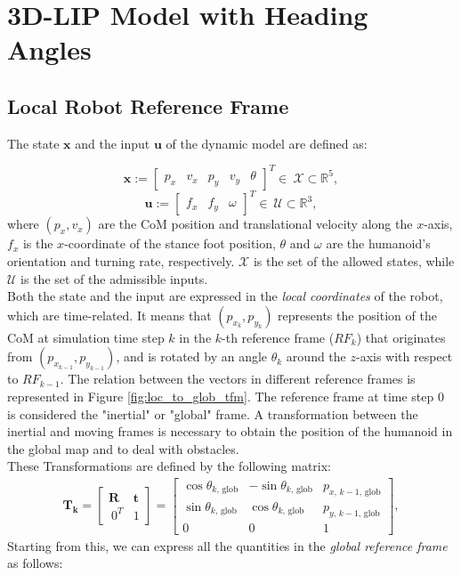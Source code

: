 \section{3D-LIP Model with Heading Angles}\label{sec:lip}

\subsection{Local Robot Reference Frame}
The state $\mathbf{x}$ and the input $\mathbf{u}$ of the dynamic model are defined as:

$$ \mathbf{x} := \begin{bmatrix} p_x & v_x & p_y & v_y & \theta \end{bmatrix}^T \in \ \mathcal{X} \subset \mathbb{R}^5 , $$
$$ \mathbf{u} := \begin{bmatrix} f_x & f_y & \omega \end{bmatrix}^T \in \ \mathcal{U} \subset \mathbb{R}^3 , $$
where $(p_x, v_x)$ are the CoM position and translational velocity along the $x$-axis, $f_x$ is the $x$-coordinate of the stance foot position, $\theta$ and $\omega$ are the humanoid's orientation and turning rate, respectively. $\mathcal{X}$ is the set of the allowed states, while $\mathcal{U}$ is the set of the admissible inputs.\\
Both the state and the input are expressed in the \textit{local coordinates} of the robot, which are time-related. It means that $(p_{x_k}, p_{y_k})$ represents the position of the CoM at simulation time step $k$ in the $k$-th reference frame ($RF_k$) that originates from $(p_{x_{k-1}}, p_{y_{k-1}})$, and is rotated by an angle $\theta_k$ around the $z$-axis with respect to $RF_{k-1}$. The relation between the vectors in different reference frames is represented in Figure \ref{fig:loc_to_glob_tfm}.
The reference frame at time step 0 is considered the "inertial" or "global" frame. A transformation between the inertial and moving frames is necessary to obtain the position of the humanoid in the global map and to deal with obstacles.\\
These Transformations are defined by the following matrix:
\begin{align}
    \mathbf{T_{k}} = 
    \begin{bmatrix}
        \mathbf{R} & \mathbf{t} \\[1ex]
        \ 0^{T} & 1
    \end{bmatrix}
    =
    \begin{bmatrix}
        \cos\theta_{k,\, \text{glob}} & -\sin\theta_{k,\, \text{glob}} & p_{x,\,k-1,\,\text{glob}} \\
        \sin\theta_{k,\, \text{glob}} & \cos\theta_{k,\, \text{glob}} &  p_{y,\,k-1,\,\text{glob}} \\
        0 & 0 & 1
    \end{bmatrix},
\end{align}
Starting from this, we can express all the quantities in the \textit{global reference frame} as follows:

